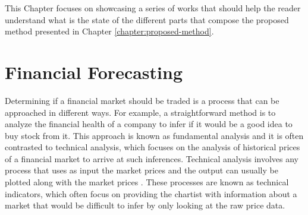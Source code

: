 











This Chapter focuses on showcasing a series of works that should help the reader
understand what is the state of the different parts that compose the proposed
method presented in Chapter \ref{chapter:proposed-method}.

\section{Financial Forecasting}
\label{section:financial-forecasting}

Determining if a financial market should be traded is a process that can be
approached in different ways. For example, a straightforward method is to
analyze the financial health of a company to infer if it would be a good idea to
buy stock from it. This approach is known as fundamental analysis
\cite{Martinez-Jaramillo2009} and it is often contrasted to technical analysis,
which focuses on the analysis of historical prices of a financial market to
arrive at such inferences. Technical analysis involves any process that uses as
input the market prices and the output can usually be plotted along with the
market prices \cite{Achelis2000}. These processes are known as technical
indicators, which often focus on providing the chartist with information about a
market that would be difficult to infer by only looking at the raw price data.

